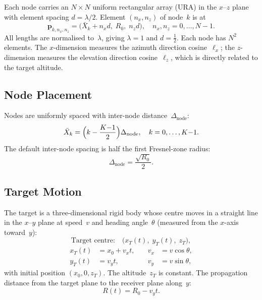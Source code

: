 \documentclass[11pt,a4paper]{article}
\begin{document}
Each node carries an $N\times N$ uniform rectangular array (URA) in
the $x$--$z$ plane with element spacing $d=\lambda/2$.  Element
$(n_x,n_z)$ of node~$k$ is at
\begin{equation}
  \mathbf{p}_{k,n_x,n_z}
  = \bigl(\bar{X}_k + n_x d,\;R_0,\;n_z d\bigr),
  \quad n_x,n_z=0,\ldots,N{-}1.
  \label{eq:element_pos}
\end{equation}
All lengths are normalised to~$\lambda$, giving $\lambda=1$ and
$d=\tfrac12$.  Each node has $N^2$ elements.  The $x$-dimension
measures the azimuth direction cosine~$\ell_x$; the $z$-dimension
measures the elevation direction cosine~$\ell_z$, which is directly
related to the target altitude.

\subsection{Node Placement}
\label{sec:node_placement}

Nodes are uniformly spaced with inter-node distance~$\Delta_{\mathrm{node}}$:
\begin{equation}
  \bar{X}_k = \Bigl(k - \frac{K{-}1}{2}\Bigr)
  \Delta_{\mathrm{node}},
  \quad k=0,\ldots,K{-}1.
  \label{eq:node_positions}
\end{equation}
The default inter-node spacing is half the first Fresnel-zone radius:
\begin{equation}
  \Delta_{\mathrm{node}} = \frac{\sqrt{R_0}}{2}.
  \label{eq:default_spacing}
\end{equation}

\subsection{Target Motion}
\label{sec:target_model}

The target is a three-dimensional rigid body whose centre moves in a
straight line in the $x$--$y$ plane at speed~$v$ and heading
angle~$\theta$ (measured from the $x$-axis toward~$y$):
\begin{equation}
  \text{Target centre:}\quad
  \bigl(x_T(t),\;y_T(t),\;z_T\bigr),
  \label{eq:target_pos}
\end{equation}
\begin{align}
  x_T(t) &= x_0 + v_x t, &\quad v_x &= v\cos\theta,
  \label{eq:xT}\\
  y_T(t) &= v_y t,        &\quad v_y &= v\sin\theta,
  \label{eq:yT}
\end{align}
with initial position $(x_0,0,z_T)$.  The altitude~$z_T$ is
constant.  The propagation distance from the target plane to the
receiver plane along~$y$:
\begin{equation}
  R(t) = R_0 - v_y t.
  \label{eq:Rt}
\end{equation}
\end{document}
